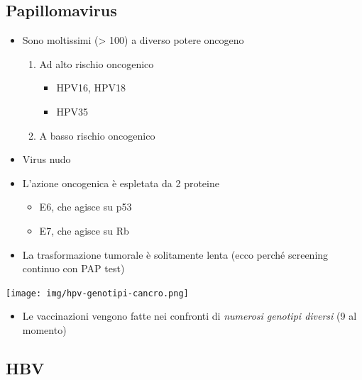 \documentclass[italian,]{article}
\providecommand{\tightlist}{%
  \setlength{\itemsep}{0pt}\setlength{\parskip}{0pt}}
\begin{document}
\hypertarget{papillomavirus}{%
\subsection{Papillomavirus}\label{papillomavirus}}

\begin{itemize}
\tightlist
\item
  Sono moltissimi (\textgreater{} 100) a diverso potere oncogeno

  \begin{enumerate}
  \def\labelenumi{\arabic{enumi}.}
  \tightlist
  \item
    Ad alto rischio oncogenico

    \begin{itemize}
    \tightlist
    \item
      HPV16, HPV18
    \item
      HPV35
    \end{itemize}
  \item
    A basso rischio oncogenico
  \end{enumerate}
\item
  Virus nudo
\item
  L'azione oncogenica è espletata da 2 proteine

  \begin{itemize}
  \tightlist
  \item
    E6, che agisce su p53
  \item
    E7, che agisce su Rb
  \end{itemize}
\item
  La trasformazione tumorale è solitamente lenta (ecco perché screening
  continuo con PAP test)
\end{itemize}

\texttt{[image: img/hpv-genotipi-cancro.png]}~

\begin{itemize}
\tightlist
\item
  Le vaccinazioni vengono fatte nei confronti di \emph{numerosi genotipi
  diversi} (9 al momento)
\end{itemize}

\hypertarget{hbv}{%
\subsection{HBV}\label{hbv}}
\end{document}
